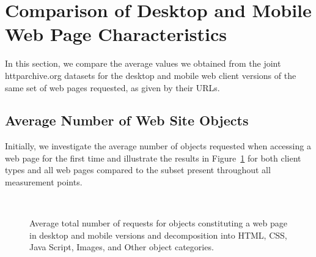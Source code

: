 \documentclass[journal,final]{IEEEtran}
\begin{document}
\section{Comparison of Desktop and Mobile Web Page Characteristics}
\label{s:compare}
In this section, we compare the average values we obtained from the joint httparchive.org datasets for the desktop and mobile web client versions of the same set of web pages requested, as given by their URLs.

\subsection{Average Number of Web Site Objects}
\label{ss:objects}
Initially, we investigate the average number of objects requested when accessing a web page for the first time and illustrate the results in Figure~\ref{fig:requests} for both client types and all web pages compared to the subset present throughout all measurement points.
\begin{figure}
\centering
	\\ 
	\qquad
	\qquad
\caption{Average total number of requests for objects constituting a web page in desktop and mobile versions and decomposition into  HTML, CSS, Java Script, Images, and Other object categories.\label{fig:requests}}
\end{figure}
\end{document}
